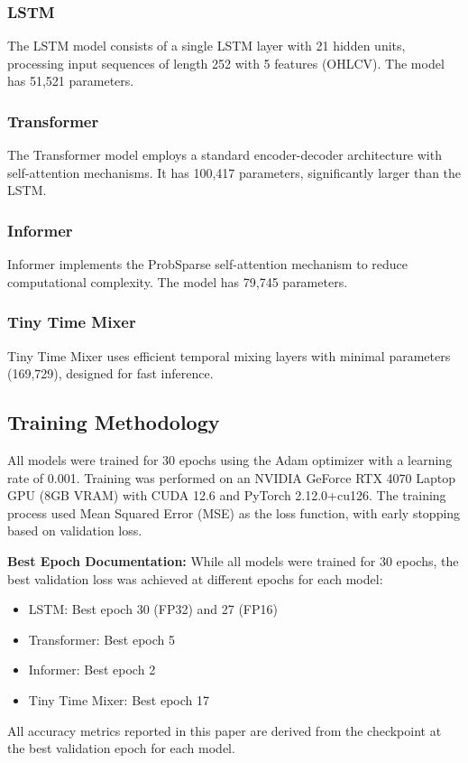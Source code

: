 \documentclass[10pt,a4paper]{article}
\begin{document}
\subsubsection{LSTM}
The LSTM model consists of a single LSTM layer with 21 hidden units, processing input sequences of length 252 with 5 features (OHLCV). The model has 51,521 parameters.

\subsubsection{Transformer}
The Transformer model employs a standard encoder-decoder architecture with self-attention mechanisms. It has 100,417 parameters, significantly larger than the LSTM.

\subsubsection{Informer}
Informer implements the ProbSparse self-attention mechanism to reduce computational complexity. The model has 79,745 parameters.

\subsubsection{Tiny Time Mixer}
Tiny Time Mixer uses efficient temporal mixing layers with minimal parameters (169,729), designed for fast inference.

\subsection{Training Methodology}
All models were trained for 30 epochs using the Adam optimizer with a learning rate of 0.001. Training was performed on an NVIDIA GeForce RTX 4070 Laptop GPU (8GB VRAM) with CUDA 12.6 and PyTorch 2.12.0+cu126. The training process used Mean Squared Error (MSE) as the loss function, with early stopping based on validation loss.

\textbf{Best Epoch Documentation:} While all models were trained for 30 epochs, the best validation loss was achieved at different epochs for each model:
\begin{itemize}
    \item LSTM: Best epoch 30 (FP32) and 27 (FP16)
    \item Transformer: Best epoch 5
    \item Informer: Best epoch 2
    \item Tiny Time Mixer: Best epoch 17
\end{itemize}
All accuracy metrics reported in this paper are derived from the checkpoint at the best validation epoch for each model.
\end{document}
